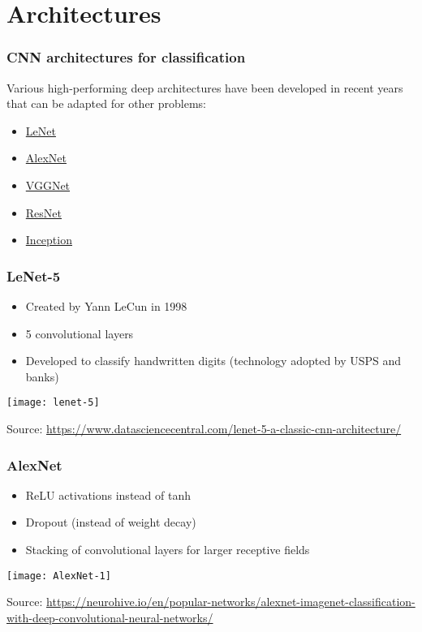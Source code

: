 \documentclass[smaller]{beamer}
\begin{document}
\section{Architectures}
\begin{frame}
  \frametitle{CNN architectures for classification}
  \pause

   Various high-performing deep architectures have been developed in recent years that can be adapted for other problems: \pause
  
   \begin{itemize}[<+->]
   \item \href{http://vision.stanford.edu/cs598_spring07/papers/Lecun98.pdf}{LeNet}
  \item \href{https://papers.nips.cc/paper/2012/file/c399862d3b9d6b76c8436e924a68c45b-Paper.pdf}{AlexNet}
  \item \href{https://arxiv.org/abs/1409.1556}{VGGNet}
  \item \href{https://arxiv.org/abs/1512.03385}{ResNet}
  \item \href{https://static.googleusercontent.com/media/research.google.com/en//pubs/archive/43022.pdf}{Inception}
  \end{itemize}
  
\end{frame}

\begin{frame}
  \frametitle{LeNet-5}
  \pe
  \begin{itemize}[<+->]
  \item Created by Yann LeCun in 1998
  \item 5 convolutional layers
  \item Developed to classify handwritten digits (technology adopted by USPS and banks)
  \end{itemize}
  \pe
  \begin{center}
    \texttt{[image: lenet-5]}

    {\tiny Source: \url{https://www.datasciencecentral.com/lenet-5-a-classic-cnn-architecture/}}
  \end{center}
\end{frame}

\begin{frame}
  \frametitle{AlexNet}
  \pe
  \begin{itemize}[<+->]
  \item ReLU activations instead of tanh
  \item Dropout (instead of weight decay)
  \item Stacking of convolutional layers for larger receptive fields
  \end{itemize}
  \pe
  \begin{center}
    \texttt{[image: AlexNet-1]}

    {\tiny Source: \url{https://neurohive.io/en/popular-networks/alexnet-imagenet-classification-with-deep-convolutional-neural-networks/}}
  \end{center}
\end{frame}
\end{document}
